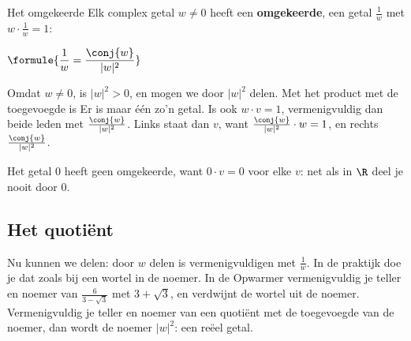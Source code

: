 \begin{theorie}
\begin{stelling}{Het omgekeerde}
Elk complex getal $w \neq 0$ heeft een \textbf{\textcolor{accent}{omgekeerde}}, een getal $\frac{1}{w}$ met $w \cdot \frac{1}{w} = 1$:

\vspace{1mm}
\qquad $\formule{\dfrac{1}{w} = \dfrac{\conj{w}}{|w|^2}}$
\end{stelling}

\begin{bewijs}
Omdat $w \neq 0$, is $|w|^2 > 0$, en mogen we door $|w|^2$ delen. Met het product met de toegevoegde is
Er is maar één zo'n getal. Is ook $w \cdot v = 1$, vermenigvuldig dan beide leden met $\frac{\conj{w}}{|w|^2}$. Links staat dan $v$, want $\frac{\conj{w}}{|w|^2} \cdot w = 1$, en rechts $\frac{\conj{w}}{|w|^2}$.
\end{bewijs}
\end{theorie}

Het getal 0 heeft geen omgekeerde, want $0 \cdot v = 0$ voor elke $v$: net als in $\R$ deel je nooit door 0.



\begin{oefeningen}
\end{oefeningen}

\subsection{Het quotiënt}

Nu kunnen we delen: door $w$ delen is vermenigvuldigen met $\frac{1}{w}$. In de praktijk doe je dat zoals bij een wortel in de noemer. In de Opwarmer vermenigvuldig je teller en noemer van $\frac{6}{3 - \sqrt3}$ met $3 + \sqrt3$, en verdwijnt de wortel uit de noemer. Vermenigvuldig je teller en noemer van een quotiënt met de toegevoegde van de noemer, dan wordt de noemer $|w|^2$: een reëel getal.

